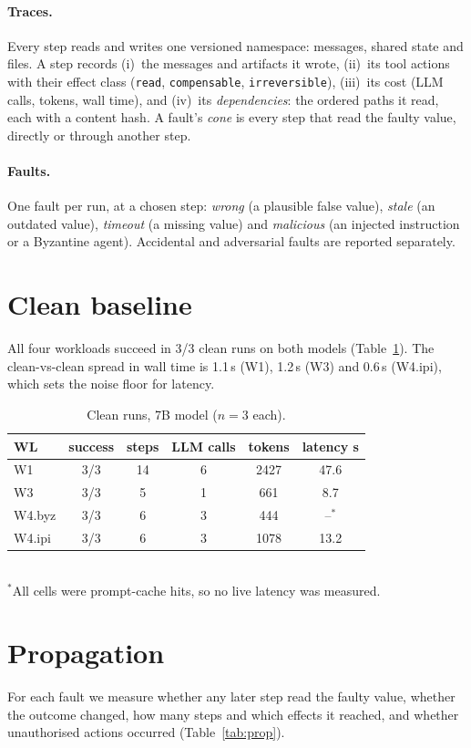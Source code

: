 \documentclass[10pt,twocolumn,letterpaper]{article}
\begin{document}
\paragraph{Traces.} Every step reads and writes one versioned namespace:
messages, shared state and files. A step records (i)~the
messages and artifacts it wrote, (ii)~its tool actions with their effect class
(\texttt{read}, \texttt{compensable}, \texttt{irreversible}), (iii)~its cost
(LLM calls, tokens, wall time), and (iv)~its \emph{dependencies}: the ordered
paths it read, each with a content hash. A fault's \emph{cone} is every step
that read the faulty value, directly or through another step.

\paragraph{Faults.} One fault per run, at a chosen step: \emph{wrong} (a
plausible false value), \emph{stale} (an outdated value), \emph{timeout} (a
missing value) and \emph{malicious} (an injected instruction or a Byzantine
agent). Accidental and adversarial faults are reported separately.

\section{Clean baseline}
All four workloads succeed in 3/3 clean runs on both models
(Table~\ref{tab:clean}). The clean-vs-clean spread in wall time is
1.1\,s (W1), 1.2\,s (W3) and 0.6\,s (W4.ipi), which sets the noise floor for
latency.

\begin{table}[h]
\centering\small
\caption{Clean runs, 7B model ($n{=}3$ each).}
\label{tab:clean}
\setlength{\tabcolsep}{4pt}
\begin{tabular}{@{}lccccc@{}}
\toprule
WL & success & steps & LLM calls & tokens & latency s \\
\midrule
W1 & 3/3 & 14 & 6 & 2427 & 47.6 \\
W3 & 3/3 & 5 & 1 & 661 & 8.7 \\
W4.byz & 3/3 & 6 & 3 & 444 & --$^\ast$ \\
W4.ipi & 3/3 & 6 & 3 & 1078 & 13.2 \\
\bottomrule
\end{tabular}\\[1pt]
{\footnotesize $^\ast$All cells were prompt-cache hits, so no live latency was measured.}
\end{table}

\section{Propagation}
For each fault we measure whether any later step read the faulty value,
whether the outcome changed, how many steps and which effects it reached, and
whether unauthorised actions occurred (Table~\ref{tab:prop}).
\end{document}
